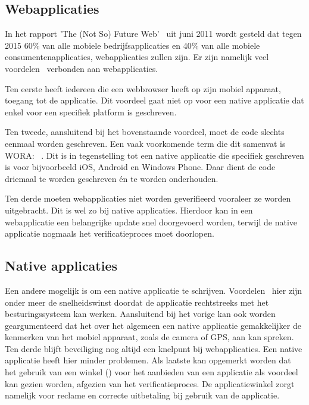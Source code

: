 \subsection{Webapplicaties}
In het rapport 'The (Not So) Future Web'~\cite{Phifer2011} uit juni 2011 wordt gesteld dat tegen 2015 60\% van alle mobiele bedrijfsapplicaties en 40\% van alle mobiele consumentenapplicaties, webapplicaties zullen zijn. 
Er zijn namelijk veel voordelen~\cite{Accenture2012} verbonden aan webapplicaties.

Ten eerste heeft iedereen die een webbrowser heeft op zijn mobiel apparaat, toegang tot de applicatie.  
Dit voordeel gaat niet op voor een native applicatie dat enkel voor een specifiek platform is geschreven. 

Ten tweede, aansluitend bij het bovenstaande voordeel, moet de code slechts eenmaal worden geschreven. 
Een vaak voorkomende term die dit samenvat is WORA: ~\cite{Hales2012}. 
Dit is in tegenstelling tot een native applicatie die specifiek geschreven is voor bijvoorbeeld iOS, Android en Windows Phone. 
Daar dient de code driemaal te worden geschreven \'en te worden onderhouden.

Ten derde moeten webapplicaties niet worden geverifieerd vooraleer ze worden uitgebracht. 
Dit is wel zo bij native applicaties. 
Hierdoor kan in een webapplicatie een belangrijke update snel doorgevoerd worden, terwijl de native applicatie nogmaals het verificatieproces moet doorlopen.

\subsection{Native applicaties}
Een andere mogelijk is om een native applicatie te schrijven. 
Voordelen~\cite{Accenture2012} hier zijn onder meer de snelheidswinst doordat de applicatie rechtstreeks met het besturingssysteem kan werken. 
Aansluitend bij het vorige kan ook worden geargumenteerd dat het over het algemeen een native applicatie gemakkelijker de kenmerken van het mobiel apparaat, zoals de camera of GPS, aan kan spreken. 
Ten derde blijft beveiliging nog altijd een knelpunt bij webapplicaties. Een native applicatie heeft hier minder problemen. 
Als laatste kan opgemerkt worden dat het gebruik van een winkel () voor het aanbieden van een applicatie als voordeel kan gezien worden, afgezien van het verificatieproces. 
De applicatiewinkel zorgt namelijk voor reclame en correcte uitbetaling bij gebruik van de applicatie.


